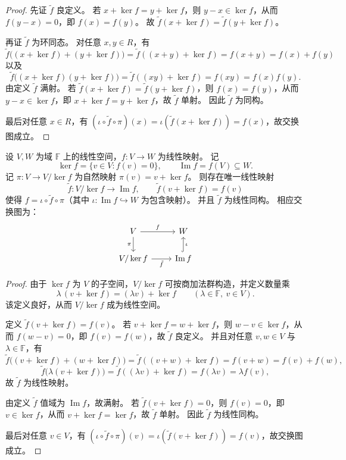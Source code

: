 \documentclass[lang=cn,a4paper,newtx]{elegantbook}
\begin{document}
\begin{proof}
先证 $\tilde f$ 良定义。
若 $x+\ker f=y+\ker f$，则 $y-x\in \ker f$，从而 $f(y-x)=0$，即 $f(x)=f(y)$。
故 $\tilde f(x+\ker f)=\tilde f(y+\ker f)$。

再证 $\tilde f$ 为环同态。
对任意 $x,y\in R$，有
\[
  \tilde f\bigl((x+\ker f)+(y+\ker f)\bigr)=\tilde f((x+y)+\ker f)=f(x+y)=f(x)+f(y)
\]
以及
\[
  \tilde f\bigl((x+\ker f)(y+\ker f)\bigr)=\tilde f((xy)+\ker f)=f(xy)=f(x)f(y).
\]
由定义 $\tilde f$ 满射。
若 $\tilde f(x+\ker f)=\tilde f(y+\ker f)$，则 $f(x)=f(y)$，从而 $y-x\in \ker f$，即 $x+\ker f=y+\ker f$，故 $\tilde f$ 单射。
因此 $\tilde f$ 为同构。

最后对任意 $x\in R$，有 $(\iota\circ\tilde f\circ\pi)(x)=\iota(\tilde f(x+\ker f))=f(x)$，故交换图成立。
\end{proof}

\begin{proposition}
设 $V,W$ 为域 $\mathbb{F}$ 上的线性空间，$f:V\to W$ 为线性映射。
记
\[
  \ker f=\{v\in V:f(v)=0\},\qquad \operatorname{Im}f=f(V)\subseteq W.
\]
记 $\pi:V\to V/\ker f$ 为自然映射 $\pi(v)=v+\ker f$。
则存在唯一线性映射
\[
  \tilde f:V/\ker f\to \operatorname{Im}f,\qquad \tilde f(v+\ker f)=f(v)
\]
使得 $f=\iota\circ\tilde f\circ\pi$（其中 $\iota:\operatorname{Im}f\hookrightarrow W$ 为包含映射）。
并且 $\tilde f$ 为线性同构。
相应交换图为：
\[
\begin{tikzcd}
 V \arrow[r,"f"] \arrow[d,"\pi"'] & W \\
 V/\ker f \arrow[r,"\tilde f"'] & \operatorname{Im}f \arrow[u,hook,"\iota"']
\end{tikzcd}
\]
\end{proposition}

\begin{proof}
由于 $\ker f$ 为 $V$ 的子空间，$V/\ker f$ 可按商加法群构造，并定义数量乘
\[
  \lambda\,(v+\ker f)=(\lambda v)+\ker f\qquad (\lambda\in \mathbb{F},\ v\in V).
\]
该定义良好，从而 $V/\ker f$ 成为线性空间。

定义 $\tilde f(v+\ker f)=f(v)$。
若 $v+\ker f=w+\ker f$，则 $w-v\in \ker f$，从而 $f(w-v)=0$，即 $f(v)=f(w)$，故 $\tilde f$ 良定义。
并且对任意 $v,w\in V$ 与 $\lambda\in \mathbb{F}$，有
\[
  \tilde f\bigl((v+\ker f)+(w+\ker f)\bigr)=\tilde f((v+w)+\ker f)=f(v+w)=f(v)+f(w),
\]
\[
  \tilde f\bigl(\lambda(v+\ker f)\bigr)=\tilde f((\lambda v)+\ker f)=f(\lambda v)=\lambda f(v),
\]
故 $\tilde f$ 为线性映射。

由定义 $\tilde f$ 值域为 $\operatorname{Im}f$，故满射。
若 $\tilde f(v+\ker f)=0$，则 $f(v)=0$，即 $v\in \ker f$，从而 $v+\ker f=\ker f$，故 $\tilde f$ 单射。
因此 $\tilde f$ 为线性同构。

最后对任意 $v\in V$，有 $(\iota\circ\tilde f\circ\pi)(v)=\iota(\tilde f(v+\ker f))=f(v)$，故交换图成立。
\end{proof}
\end{document}
